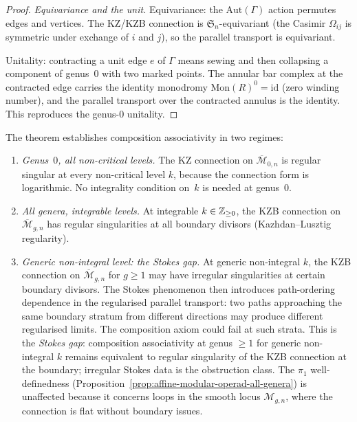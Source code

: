 \begin{proof}
\medskip\noindent
\emph{Equivariance and the unit.}
Equivariance: the $\mathrm{Aut}(\Gamma)$ action permutes edges
and vertices. The KZ\slash KZB connection is
$\mathfrak{S}_n$-equivariant \textup{(}the Casimir
$\Omega_{ij}$ is symmetric under exchange of $i$ and $j$\textup{)},
so the parallel transport is equivariant.

Unitality: contracting a unit edge $e$ of $\Gamma$ means
sewing and then collapsing a component of genus~$0$ with two
marked points. The annular bar complex at the contracted edge
carries the identity monodromy
$\mathrm{Mon}(R)^0 = \mathrm{id}$ \textup{(}zero winding
number\textup{)}, and the parallel transport over the contracted
annulus is the identity. This reproduces the genus-$0$
unitality.
\end{proof}

\begin{remark}
\label{rem:composition-associativity-scope}
The theorem establishes composition associativity in two regimes:
\begin{enumerate}[label=\textup{(\roman*)}]
\item \emph{Genus~$0$, all non-critical levels.}
 The KZ connection on $\overline{\mathcal{M}}_{0,n}$ is
 regular singular at every non-critical level $k$, because
 the connection form is logarithmic. No integrality
 condition on~$k$ is needed at genus~$0$.

\item \emph{All genera, integrable levels.}
 At integrable $k \in \mathbb{Z}_{\ge 0}$, the KZB connection on
 $\overline{\mathcal{M}}_{g,n}$ has regular singularities
 at all boundary divisors
 \textup{(}Kazhdan--Lusztig regularity\textup{)}.

\item \emph{Generic non-integral level: the Stokes gap.}
 At generic non-integral $k$, the KZB connection on
 $\overline{\mathcal{M}}_{g,n}$ for $g \ge 1$ may have
 irregular singularities at certain boundary divisors.
 The Stokes phenomenon then introduces path-ordering
 dependence in the regularised parallel transport: two
 paths approaching the same boundary stratum from different
 directions may produce different regularised limits.
The composition axiom could fail at such strata.
This is the \emph{Stokes gap}: composition associativity
at genus $\ge 1$ for generic non-integral $k$ remains
equivalent to regular singularity of the KZB connection at the
boundary; irregular Stokes data is the obstruction class.
 The $\pi_1$ well-definedness
 \textup{(}Proposition~\textup{\ref{prop:affine-modular-operad-all-genera}}\textup{)}
 is unaffected because it concerns loops in the smooth
 locus $\mathcal{M}_{g,n}$, where the connection is flat
 without boundary issues.
\end{enumerate}
\end{remark}

